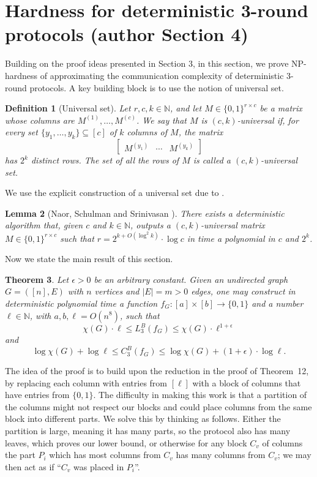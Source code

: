 \documentclass[10pt,a4paper]{article}
\newtheorem{theorem}{Theorem}
\newtheorem{lemma}[theorem]{Lemma}
\newtheorem{definition}[theorem]{Definition}
\begin{document}
\section*{Hardness for deterministic 3-round protocols (author Section 4)}
Building on the proof ideas presented in Section 3, in this section, we prove NP-hardness of approximating the communication complexity of deterministic 3-round protocols. A key building block is to use the notion of universal set.
\setcounter{theorem}{14}
\begin{definition}[Universal set]
Let $r,c,k\in\mathbb N$, and let $M\in\{0,1\}^{r\times c}$ be a matrix whose columns are $M^{(1)},\ldots,M^{(c)}$. We say that $M$ is $(c,k)$-universal if, for every set $\{y_1,\ldots,y_k\}\subseteq[c]$ of $k$ columns of $M$, the matrix
\[\begin{bmatrix}M^{(y_1)}&\cdots&M^{(y_k)}\end{bmatrix}\]
has $2^k$ distinct rows. The set of all the rows of $M$ is called a $(c,k)$-universal set.
\end{definition}
We use the explicit construction of a universal set due to \cite{ref49}.
\begin{lemma}[Naor, Schulman and Srinivasan \cite{ref51}]
There exists a deterministic algorithm that, given $c$ and $k\in\mathbb N$, outputs a $(c,k)$-universal matrix $M\in\{0,1\}^{r\times c}$ such that $r=2^{k+O(\log^2 k)}\cdot\log c$ in time a polynomial in $c$ and $2^k$.
\end{lemma}
Now we state the main result of this section.
\begin{theorem}\label{thm:boolean-construction}
Let $\epsilon>0$ be an arbitrary constant. Given an undirected graph $G=([n],E)$ with $n$ vertices and $|E|=m>0$ edges, one may construct in deterministic polynomial time a function $f_G:[a]\times[b]\to\{0,1\}$ and a number $\ell\in\mathbb N$, with $a,b,\ell=O(n^8)$, such that
\[\chi(G)\cdot\ell\le L_3^B(f_G)\le\chi(G)\cdot\ell^{1+\epsilon}\]
and
\[\log\chi(G)+\log\ell\le C_3^B(f_G)\le\log\chi(G)+(1+\epsilon)\cdot\log\ell.\]
\end{theorem}
The idea of the proof is to build upon the reduction in the proof of Theorem~12, by replacing each column with entries from $[\ell]$ with a block of columns that have entries from $\{0,1\}$. The difficulty in making this work is that a partition of the columns might not respect our blocks and could place columns from the same block into different parts. We solve this by thinking as follows. Either the partition is large, meaning it has many parts, so the protocol also has many leaves, which proves our lower bound, or otherwise for any block $C_v$ of columns the part $P_i$ which has most columns from $C_v$ has many columns from $C_v$; we may then act as if ``$C_v$ was placed in $P_i$''.
\end{document}
